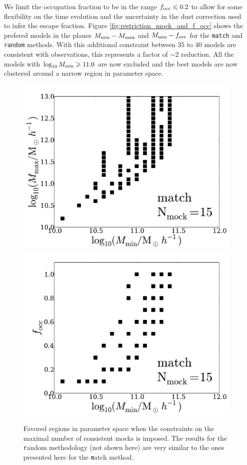\documentclass[usenatbib]{mn2e}
\begin{document}
We limit the occupation fraction to
be in the range $f_{\rm  occ}\leq 0.2$ to allow for some flexibility on the time evolution
and the uncertainty in the dust correction used to infer the escape fraction. 
Figure  \ref{fig:restriction_mock_and_f_occ}  shows the prefered
models in the planes $M_{\rm min}-M_{\rm  max}$ and $M_{\rm
  min}-f_{\rm occ}$ for the {\tt match} and {\tt   random} methods.
With this additional constraint between $35$ to $40$ models are
consistent with observations, this represents a factor of $\sim 2$
reduction. All the models with $\log_{10}M_{\rm min}\geq 11.0$ are now
excluded and the best models are now clustered around a narrow region
in parameter space. %

\begin{figure}
\begin{center}
\includegraphics[width=0.46\linewidth,angle=0]{./plots/Fig5_match_mass_mock.pdf}
\hspace{5mm}
\includegraphics[width=0.46\linewidth,angle=0]{./plots/Fig5_match_f_occ_mock.pdf}
\end{center} 
\caption{Favored regions in parameter space when the constraints on
  the maximal number of consistent mocks is imposed. The results for
  the {\texttt random} methodology (not shown here) are very similar to the ones
  presented here for the {\texttt match} method.
  \label{fig:restriction_mock}}  
\end{figure}
\end{document}
